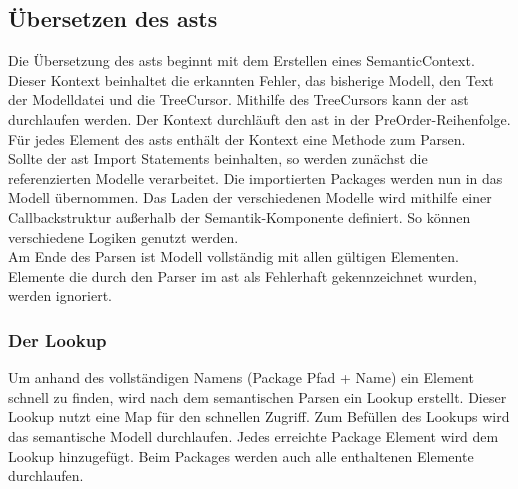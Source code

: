 \documentclass[./einleitung.tex]{subfiles}
\begin{document}
    \subsection{Übersetzen des \acrshort{ast}s}\label{subsec:ubersetzen-des-asts}
    Die Übersetzung des \acrshort{ast}s beginnt mit dem Erstellen eines SemanticContext.
    Dieser Kontext beinhaltet die erkannten Fehler, das bisherige Modell, den Text der Modelldatei und die TreeCursor.
    Mithilfe des TreeCursors kann der \acrshort{ast} durchlaufen werden.
    Der Kontext durchläuft den \acrshort{ast} in der PreOrder-Reihenfolge.
    Für jedes Element des \acrshort{ast}s enthält der Kontext eine Methode zum Parsen.\\
    Sollte der \acrshort{ast} Import Statements beinhalten, so werden zunächst die referenzierten Modelle verarbeitet.
    Die importierten Packages werden nun in das Modell übernommen.
    Das Laden der verschiedenen Modelle wird mithilfe einer Callbackstruktur außerhalb der Semantik-Komponente definiert.
    So können verschiedene Logiken genutzt werden. \\
    Am Ende des Parsen ist Modell vollständig mit allen gültigen Elementen.
    Elemente die durch den Parser im \acrshort{ast} als Fehlerhaft gekennzeichnet wurden, werden ignoriert.

    \subsubsection{Der Lookup}\label{subsubsec:lookup}
    Um anhand des vollständigen Namens (Package Pfad + Name) ein Element schnell zu finden, wird nach dem semantischen Parsen ein Lookup erstellt.
    Dieser Lookup nutzt eine Map für den schnellen Zugriff.
    Zum Befüllen des Lookups wird das semantische Modell durchlaufen.
    Jedes erreichte Package Element wird dem Lookup hinzugefügt.
    Beim Packages werden auch alle enthaltenen Elemente durchlaufen.
\end{document}
